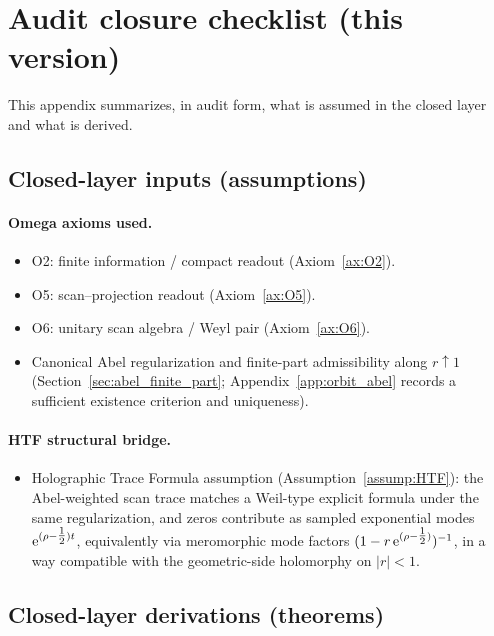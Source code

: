 
\section{Audit closure checklist (this version)}
\label{app:audit_checklist}

This appendix summarizes, in audit form, what is assumed in the closed layer and what is derived.

\subsection{Closed-layer inputs (assumptions)}
\label{app:closed_inputs}

\paragraph{Omega axioms used.}
\begin{itemize}
\item O2: finite information / compact readout (Axiom~\ref{ax:O2}).
\item O5: scan--projection readout (Axiom~\ref{ax:O5}).
\item O6: unitary scan algebra / Weyl pair (Axiom~\ref{ax:O6}).
\item Canonical Abel regularization and finite-part admissibility along $r\uparrow 1$ (Section~\ref{sec:abel_finite_part}; Appendix~\ref{app:orbit_abel} records a sufficient existence criterion and uniqueness).
\end{itemize}

\paragraph{HTF structural bridge.}
\begin{itemize}
\item Holographic Trace Formula assumption (Assumption~\ref{assump:HTF}): the Abel-weighted scan trace matches a Weil-type explicit formula under the same regularization, and zeros contribute as sampled exponential modes $\mathrm{e}^{(\rho-\tfrac{1}{2})t}$, equivalently via meromorphic mode factors $(1-r\,\mathrm{e}^{(\rho-\tfrac{1}{2})})^{-1}$, in a way compatible with the geometric-side holomorphy on $|r|<1$.
\end{itemize}

\subsection{Closed-layer derivations (theorems)}
\label{app:closed_derivations}

